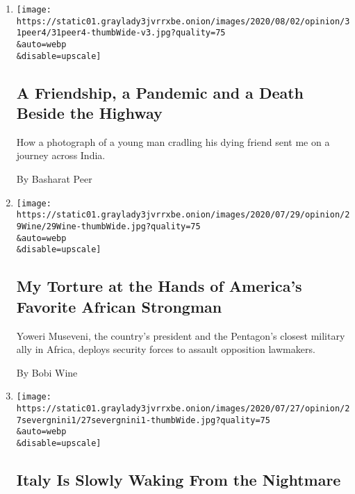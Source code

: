 \begin{enumerate}
\def\labelenumi{\arabic{enumi}.}
\item
  \href{/2020/07/31/opinion/sunday/India-migration-coronavirus.html}{}

  \texttt{[image: https://static01.graylady3jvrrxbe.onion/images/2020/08/02/opinion/31peer4/31peer4-thumbWide-v3.jpg?quality=75\\\&auto=webp\\\&disable=upscale]}

  \hypertarget{a-friendship-a-pandemic-and-a-death-beside-the-highway}{%
  \subsection{A Friendship, a Pandemic and a Death Beside the
  Highway}\label{a-friendship-a-pandemic-and-a-death-beside-the-highway}}

  How a photograph of a young man cradling his dying friend sent me on a
  journey across India.

  By Basharat Peer
\item
  \href{/2020/07/29/opinion/uganda-museveni-repression.html}{}

  \texttt{[image: https://static01.graylady3jvrrxbe.onion/images/2020/07/29/opinion/29Wine/29Wine-thumbWide.jpg?quality=75\\\&auto=webp\\\&disable=upscale]}

  \hypertarget{my-torture-at-the-hands-of-americas-favorite-african-strongman}{%
  \subsection{My Torture at the Hands of America's Favorite African
  Strongman}\label{my-torture-at-the-hands-of-americas-favorite-african-strongman}}

  Yoweri Museveni, the country's president and the Pentagon's closest
  military ally in Africa, deploys security forces to assault opposition
  lawmakers.

  By Bobi Wine
\item
  \href{/2020/07/27/opinion/italy-coronavirus.html}{}

  \texttt{[image: https://static01.graylady3jvrrxbe.onion/images/2020/07/27/opinion/27severgnini1/27severgnini1-thumbWide.jpg?quality=75\\\&auto=webp\\\&disable=upscale]}

  \hypertarget{italy-is-slowly-waking-from-the-nightmare}{%
  \subsection{Italy Is Slowly Waking From the
  Nightmare}\label{italy-is-slowly-waking-from-the-nightmare}}


\end{enumerate}
